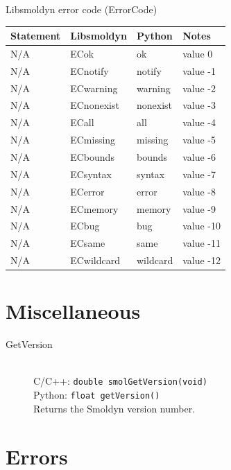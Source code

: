 \documentclass {scrbook}
\newcommand {\ttt} {\texttt}
\begin{document}
Libsmoldyn error code (ErrorCode)
\begin{longtable}[c]{llll}
Statement & Libsmoldyn & Python & Notes\\
\hline
N/A & ECok & ok & value 0\\
N/A & ECnotify & notify & value -1\\
N/A & ECwarning & warning & value -2\\
N/A & ECnonexist & nonexist & value -3\\
N/A & ECall & all & value -4\\
N/A & ECmissing & missing & value -5\\
N/A & ECbounds & bounds & value -6\\
N/A & ECsyntax & syntax & value -7\\
N/A & ECerror & error & value -8\\
N/A & ECmemory & memory & value -9\\
N/A & ECbug & bug & value -10\\
N/A & ECsame & same & value -11\\
N/A & ECwildcard & wildcard & value -12
\end{longtable}


\section{Miscellaneous}

\begin{description}

\item[GetVersion]
\hfill \\
C/C++: \ttt{double smolGetVersion(void)}\\
Python: \ttt{float getVersion()}\\
Returns the Smoldyn version number.

\end{description}

\section{Errors}
\end{document}
